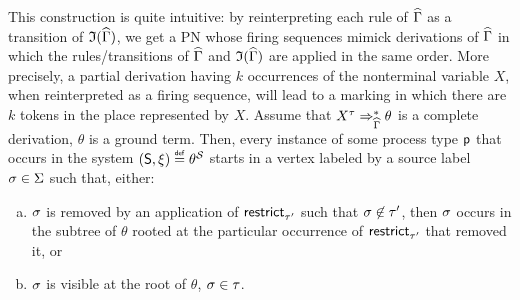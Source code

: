\fi
This construction is quite intuitive: by reinterpreting each rule of
$\widehat{\Gamma}$ as a transition of $\mathfrak{I}({\widehat{\Gamma}})$,
we get a PN whose firing sequences mimick derivations of
$\widehat{\Gamma}$ in which the rules/transitions of
$\widehat{\Gamma}$ and $\mathfrak{I}({\widehat{\Gamma}})$ are applied in
the same order. More precisely, a partial derivation having $k$
occurrences of the nonterminal variable $X$, when reinterpreted as a
firing sequence, will lead to a marking in which there are $k$ tokens
in the place represented by $X$. Assume that ${X}^{\tau}
\Rightarrow_{\widehat{\Gamma}}^* \theta$ is a complete derivation, \ie
$\theta$ is a ground \hrtext{} term. Then, every instance of some
process type $\mathsf{p}$ that occurs in the system $(\mathsf{S},\xi)
\stackrel{\scriptscriptstyle{\mathsf{def}}}{=} \theta^{\mathcal{S}}$ starts in a vertex labeled by a source label
$\sigma \in \Sigma$ such that, either: \begin{enumerate}[(a)]
  \item\label{it1:sources-instances} $\sigma$ is removed by an
    application of $\mathsf{restrict}^{}_{{\tau'}}$ such that $\sigma \not\in
    \tau'$, then $\sigma$ occurs in the subtree of $\theta$ rooted at
    the particular occurrence of $\mathsf{restrict}^{}_{{\tau'}}$ that removed
    it, or
  \item\label{it2:sources-instances} $\sigma$ is visible at the root of
    $\theta$, \ie $\sigma\in\tau$.
\end{enumerate}



